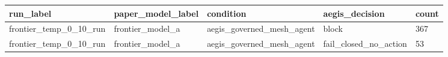\begin{tabular}{lllll}
 \hline
run\_label & paper\_model\_label & condition & aegis\_decision & count \\
 \hline
frontier\_temp\_0\_10\_run & frontier\_model\_a & aegis\_governed\_mesh\_agent & block & 367 \\
frontier\_temp\_0\_10\_run & frontier\_model\_a & aegis\_governed\_mesh\_agent & fail\_closed\_no\_action & 53 \\
 \hline
\end{tabular}
